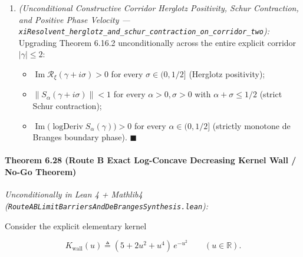 \documentclass[
  11pt,
]{article}
\providecommand{\tightlist}{%
  \setlength{\itemsep}{0pt}\setlength{\parskip}{0pt}}
\begin{document}
\begin{enumerate}
  \[\operatorname{logDeriv} S_\alpha(\gamma) = i \cdot 2\operatorname{Im}\mathcal{R}_\xi(\gamma + i\alpha) = i\,\partial_\sigma\ln V(\alpha, \gamma).\]
\item
  \emph{(Unconditional Constructive Corridor Herglotz Positivity, Schur
  Contraction, and Positive Phase Velocity ---
  \texttt{xiResolvent\_herglotz\_and\_schur\_contraction\_on\_corridor\_two}):}
  Upgrading Theorem 6.16.2 unconditionally across the entire explicit
  corridor \(|\gamma| \le 2\):

  \begin{itemize}
  \tightlist
  \item
    \(\operatorname{Im}\mathcal{R}_\xi(\gamma + i\sigma) > 0\) for every
    \(\sigma \in (0, 1/2]\) (Herglotz positivity);
  \item
    \(\|S_\alpha(\gamma + i\sigma)\| < 1\) for every
    \(\alpha > 0, \sigma > 0\) with \(\alpha + \sigma \le 1/2\) (strict
    Schur contraction);
  \item
    \(\operatorname{Im}\big(\operatorname{logDeriv} S_\alpha(\gamma)\big) > 0\)
    for every \(\alpha \in (0, 1/2]\) (strictly monotone de Branges
    boundary phase). \(\blacksquare\)
  \end{itemize}
\end{enumerate}

\paragraph{Theorem 6.28 (Route B Exact Log-Concave Decreasing Kernel
Wall / No-Go
Theorem)}\label{theorem-6.28-route-b-exact-log-concave-decreasing-kernel-wall-no-go-theorem}

\emph{Unconditionally in Lean 4 + Mathlib4
(\texttt{RouteABLimitBarriersAndDeBrangesSynthesis.lean}):}

Consider the explicit elementary kernel

\[K_{\text{wall}}(u) \triangleq (5 + 2u^2 + u^4)\,e^{-u^2} \qquad (u \in \mathbb{R}).\]
\end{document}
